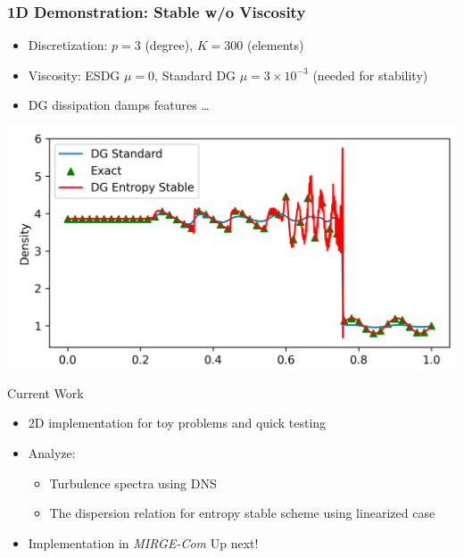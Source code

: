 \begin{frame}\frametitle{1D Demonstration:  Stable w/o Viscosity}
	\begin{itemize}
	
		\item Discretization: $p=3$ (degree), $K = 300$ (elements)
		\item Viscosity: ESDG $\mu = 0$, Standard DG $\mu = 3\times 10^{-3}$ (needed for stability)
                \item DG dissipation damps features \ldots
                \end{itemize}
                \medskip
                \begin{center}
                          \includegraphics[width=0.6\linewidth]{figures/RHO.png}          
	\end{center}
        \centerline{}
\end{frame}

\begin{frame}{Current Work}
	\begin{itemize}
		\setlength{\itemsep}{0.2in}
		\item  2D implementation for toy problems and quick testing
		\item Analyze:
		\begin{itemize}
			\item Turbulence spectra using DNS
			\item The dispersion relation for entropy stable scheme using linearized case
		\end{itemize}
		\item  Implementation in \textit{MIRGE-Com} Up next!
	\end{itemize}
      \end{frame}

